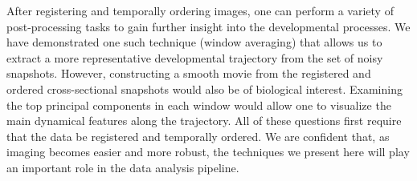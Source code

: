 \documentclass{pnastwo}
\begin{document}
\begin{article}
After registering and temporally ordering images, one can perform a variety of post-processing tasks to gain further insight into the developmental processes.
%
We have demonstrated one such technique (window averaging) that allows us to extract a more representative developmental trajectory from the set of noisy snapshots. 
%
However, constructing a smooth movie from the registered and ordered cross-sectional snapshots would also be of biological interest.
%
Examining the top principal components in each window would allow one to visualize the main dynamical features along the trajectory.
%
All of these questions first require that the data be registered and temporally ordered.
%
We are confident that, as imaging becomes easier and more robust, the techniques we present here will play an important role in the data analysis pipeline. 


 






\end{article}
\end{document}
